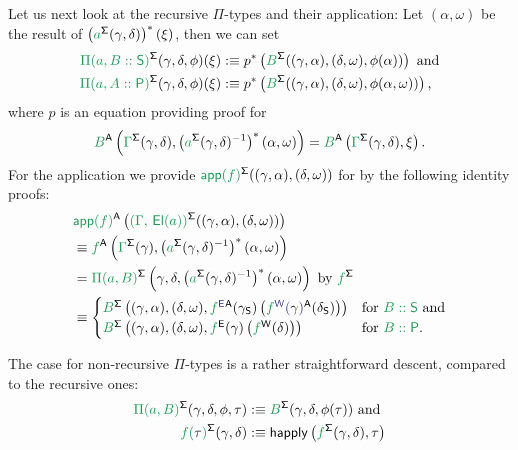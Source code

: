 \begin{defn}
Let us next look at the recursive $\Pi$-types and their application:
Let $(\alpha, \omega)$ be the result of
$\left(\grm{a}^\Sg(\gamma, \delta)\right)^*(\xi)$, then
we can set
\begin{align*}
\grm{\Pi(a, B :: \Sc)}^\Sg(\gamma, \delta, \phi)(\xi)
  &:\equiv p^*\left(\grm{B}^\Sg((\gamma, \alpha), (\delta, \omega), \phi(\alpha))\right)
    \text{ and} \\
\grm{\Pi(a, A :: \Pc)}^\Sg(\gamma, \delta, \phi)(\xi)
  &:\equiv p^*\left(\grm{B}^\Sg((\gamma, \alpha), (\delta, \omega), \phi(\alpha, \omega))\right)
    \text{,}
\end{align*}
where $p$ is an equation providing proof for
\begin{equation*}
\grm{B}^\CC\left(\grm{\Gamma}^\Sg(\gamma, \delta), \left(\grm{a}^\Sg(\gamma, \delta)\inv\right)^*(\alpha, \omega) \right)
  = \grm{B}^\CC\left(\grm{\Gamma}^\Sg(\gamma, \delta), \xi \right) \text{.}
\end{equation*}
For the application we provide 
$\grm{\IIapp(f)}^\Sg((\gamma, \alpha), (\delta, \omega))$ for
 by the following
identity proofs:
\begin{align*}
  & \grm{\IIapp(f)}^\CC\left(\grm{(\Gamma,\,\El(a))}^\Sg((\gamma, \alpha), (\delta, \omega))\right) \\
  &\equiv \grm{f}^\CC\left(\grm{\Gamma}^\Sg(\gamma), \left(\grm{a}^\Sg(\gamma, \delta)\inv\right)^*(\alpha, \omega)\right) \\
  &= \grm{\Pi(a, B)}^\Sg\left(\gamma, \delta, \left(\grm{a}^\Sg(\gamma, \delta)\inv\right)^*(\alpha, \omega)\right) \text{ by $\grm{f}^\Sg$}\\
  &\equiv 
    \begin{cases}
    \grm{B}^\Sg\left((\gamma, \alpha), (\delta, \omega),
    \tqm{\grm{f}^\EE }^\CC(\gamma_\Sc)
      \left(\tqm{\grm{f}^\WW(\blgamma)}^\CC(\delta_\Sc)\right)\right)
     & \text{for \grm{B :: \Sc} and} \\
    \grm{B}^\Sg\left((\gamma, \alpha), (\delta, \omega),
     \grm{f}^\EE(\gamma)\left(\grm{f}^\WW(\delta)\right)\right)
     & \text{for \grm{B :: \Pc}.}
    \end{cases}
\end{align*}

The case for non-recursive $\Pi$-types is a rather straightforward descent,
compared to the recursive ones:
\begin{align*}
\grm{\Pi(a, B)}^\Sg(\gamma, \delta, \phi, \tau)
  &:\equiv \grm{B}^\Sg(\gamma, \delta, \phi(\tau)) \text{ and}\\
\grm{f(\bltau)}^\Sg(\gamma, \delta)
  &:\equiv \happly\left(\grm{f}^\Sg(\gamma, \delta), \tau\right)
\end{align*}


\end{defn}
